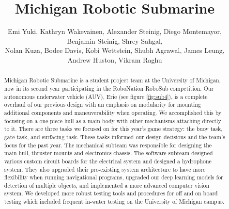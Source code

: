 \documentclass[conference]{IEEEtran}
\begin{document}
\title{Michigan Robotic Submarine}
\author{Emi Yuki, Kathryn Wakevainen, Alexander Steinig, Diego Montemayor, Benjamin Steinig, Shrey Sahgal, \\ Nolan Kuza, Bodee Davis, Kobi Wettstein, Shubh Agrawal, James Leung, Andrew Huston, Vikram Raghu
}

\maketitle
\pagestyle{fancy}
\rhead{\thepage}

\begin{abstract}
Michigan Robotic Submarine is a student project team at the University of Michigan, now in its second year participating in the RoboNation RoboSub competition. Our autonomous underwater vehicle (AUV), Erie (see figure \ref{fig:sub4}), is a complete overhaul of our previous design with an emphasis on modularity for mounting additional components and maneuverability when operating. We accomplished this by focusing on a one-piece hull as a main body with other mechanisms attaching directly to it. There are three tasks we focused on for this year’s game strategy: the buoy task, gate task, and surfacing task. These tasks informed our design decisions and the team's focus for the past year. The mechanical subteam was responsible for designing the main hull, thruster mounts and electronics chassis. The software subteam designed various custom circuit boards for the electrical system and designed a hydrophone system. They also upgraded their pre-existing system architecture to have more flexibility when running navigational programs, upgraded our deep learning models for detection of multiple objects, and implemented a more advanced computer vision system. We developed more robust testing tools and procedures for off and on board testing which included frequent in-water testing on the University of Michigan campus.
\end{abstract}
\end{document}
